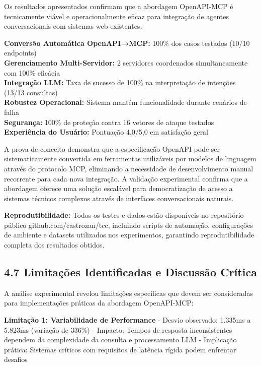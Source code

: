 \documentclass[
]{article}
\begin{document}
Os resultados apresentados confirmam que a abordagem OpenAPI-MCP é
tecnicamente viável e operacionalmente eficaz para integração de agentes
conversacionais com sistemas web existentes:

\textbf{Conversão Automática OpenAPI→MCP:} 100\% dos casos testados
(10/10 endpoints)\\
\textbf{Gerenciamento Multi-Servidor:} 2 servidores coordenados
simultaneamente com 100\% eficácia\\
\textbf{Integração LLM:} Taxa de sucesso de 100\% na interpretação de
intenções (13/13 consultas)\\
\textbf{Robustez Operacional:} Sistema mantém funcionalidade durante
cenários de falha\\
\textbf{Segurança:} 100\% de proteção contra 16 vetores de ataque
testados\\
\textbf{Experiência do Usuário:} Pontuação 4,0/5,0 em satisfação geral

A prova de conceito demonstra que a especificação OpenAPI pode ser
sistematicamente convertida em ferramentas utilizáveis por modelos de
linguagem através do protocolo MCP, eliminando a necessidade de
desenvolvimento manual recorrente para cada nova integração. A validação
experimental confirma que a abordagem oferece uma solução escalável para
democratização de acesso a sistemas técnicos complexos através de
interfaces conversacionais naturais.

\textbf{Reprodutibilidade:} Todos os testes e dados estão disponíveis no
repositório público github.com/castrozan/tcc, incluindo scripts de
automação, configurações de ambiente e datasets utilizados nos
experimentos, garantindo reprodutibilidade completa dos resultados
obtidos.

\subsection{4.7 Limitações Identificadas e Discussão
Crítica}\label{limitauxe7uxf5es-identificadas-e-discussuxe3o-cruxedtica}

A análise experimental revelou limitações específicas que devem ser
consideradas para implementações práticas da abordagem OpenAPI-MCP:

\textbf{Limitação 1: Variabilidade de Performance} - Desvio observado:
1.335ms a 5.823ms (variação de 336\%) - Impacto: Tempos de resposta
inconsistentes dependem da complexidade da consulta e processamento LLM
- Implicação prática: Sistemas críticos com requisitos de latência
rígida podem enfrentar desafios
\end{document}
